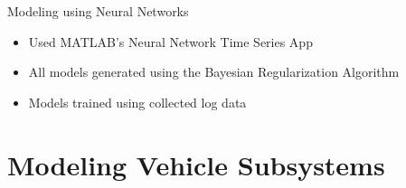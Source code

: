 \documentclass{beamer}
\begin{document}
\begin{frame}{Modeling using Neural Networks}{}
	\begin{block}{}
 \begin{itemize}
        \item Used MATLAB's Neural Network Time Series App 
        \item All models generated using the Bayesian Regularization Algorithm 
        \item Models trained using collected log data 
\end{itemize}
  \end{block}
\end{frame}

\section{Modeling Vehicle Subsystems}
\end{document}
